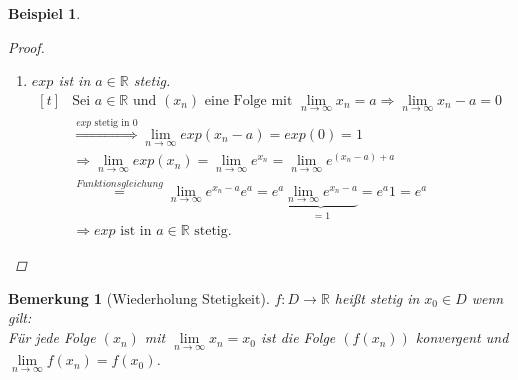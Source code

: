 \documentclass[a4paper,titlepage,oneside]{article}
\def\R{\ensuremath{\mathbb{R}} }
\renewcommand{\liminf}[2][n]{\ensuremath{\lim\limits_{#1 \rightarrow \infty}{#2}}}
\newcommand{\abs}[1]{\ensuremath{\left|\:#1\:\right|}}
\theoremstyle{thmstyle}
\newtheorem{bsp}[satz]{Beispiel}
\newtheorem{bem}[satz]{Bemerkung}
\theoremstyle{subthmstyle}
\begin{document}
\begin{bsp}
\begin{enumerate}
\begin{proof}
\begin{enumerate}
\begin{enumerate}[label=\roman*)]
  \item Sei $(x_n)$ eine Folge mit $\liminf{x_n} = 0$
  \begin{math}\displaystyle \begin{aligned}[t]
  &\Rightarrow \liminf{\abs{exp(x_n) -1}} \overset{i)}{\le} \liminf{2\abs{x_n}} = 0 \\
  &\Rightarrow \liminf{exp(x_n)} = 1 = exp(0)
  \end{aligned}\end{math} 
  \end{enumerate}

\item $exp$ ist in $a \in \R$ stetig.
\begin{math}\displaystyle \begin{aligned}[t]
&\text{Sei } a \in \R \text{ und } (x_n) \text{ eine Folge mit } \liminf{x_n} = a
\Rightarrow \liminf{x_n - a} = 0 \\
&\overset{\text{$exp$ stetig in $0$}}{\Rightarrow} \liminf{exp(x_n -a)} = exp(0) = 1 \\
&\Rightarrow \liminf{exp(x_n)} = \liminf{e^{x_n}} = \liminf{e^{(x_n - a)+a}} \\
&\overset{Funktionsgleichung}{=} \liminf{e^{x_n-a} e^a} = e^a \underbrace{\liminf{e^{x_n-a}}}_{=1} = e^a 1 = e^a \\
&\Rightarrow exp \text{ ist in } a \in \R \text{ stetig.}
\end{aligned}\end{math} 
\end{enumerate}
\end{proof}
\end{enumerate}
\end{bsp}

\begin{bem}[Wiederholung Stetigkeit]
$ f: D \to \R $ heißt stetig in $x_0 \in D$ wenn gilt: \\
Für jede Folge $(x_n)$ mit $\liminf{x_n} = x_0$ ist die Folge $(f(x_n))$ konvergent und $\liminf{f(x_n)} = f(x_0)$.
\end{bem}
\end{document}
